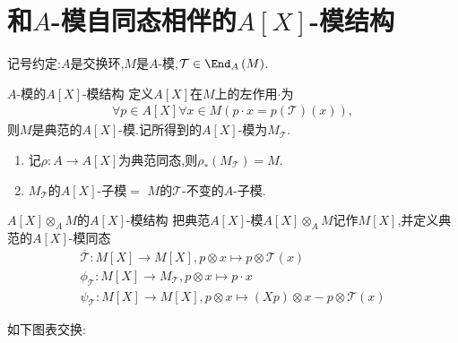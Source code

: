 \section{和\texorpdfstring{$A$}{A}-模自同态相伴的\texorpdfstring{$A\left[X\right]$}{A[X]}-模结构}

记号约定:$A$是交换环,$M$是$A$-模,$\mathcal{T}\in\End_{A}\left(M\right)$.

\begin{definition}{$A$-模的$A\left[X\right]$-模结构}{}
	定义$A\left[X\right]$在$M$上的左作用$\cdot$为
	\begin{align*}
		\forall p\in A\left[X\right]\forall x\in M\left(p\cdot x=p\left(\mathcal{T}\right)\left(x\right)\right),
	\end{align*}
	则$M$是典范的$A\left[X\right]$-模.记所得到的$A\left[X\right]$-模为$M_{\mathcal{T}}$.
\end{definition}

\begin{remark}{}{}
	\begin{enumerate}
		\item 记$\rho:A\to A\left[X\right]$为典范同态,则$\rho_{\ast}\left(M_{\mathcal{T}}\right)=M$.
		\item $M_{\mathcal{T}}$的$A\left[X\right]$-子模$=$ $M$的$\mathcal{T}$-不变的$A$-子模.
	\end{enumerate}
\end{remark}

\begin{definition}{$A\left[X\right]\otimes_{A}M$的$A\left[X\right]$-模结构}{}
	把典范$A\left[X\right]$-模$A\left[X\right]\otimes_{A}M$记作$M\left[X\right]$,并定义典范的$A\left[X\right]$-模同态
	\begin{gather*}
		\overline{\mathcal{T}}:M\left[X\right]\to M\left[X\right],p\otimes x\mapsto p\otimes\mathcal{T}\left(x\right)\\
		\phi_{\mathcal{T}}:M\left[X\right]\to M_{\mathcal{T}},p\otimes x\mapsto p\cdot x\\
		\psi_{\mathcal{T}}:M\left[X\right]\to M\left[X\right],p\otimes x\mapsto\left(Xp\right)\otimes x-p\otimes\mathcal{T}\left(x\right)
	\end{gather*}
\end{definition}

\begin{proposition}{}{}
	如下图表交换:
	\begin{center}
	\end{center}
\end{proposition}


